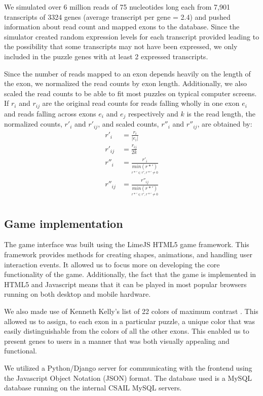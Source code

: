 \documentclass[12pt]{article}
\begin{document}
We simulated over 6 million reads of 75 nucleotides long each from 7,901 transcripts of 3324 genes (average transcript per gene = 2.4) and pushed information about read count and mapped exons to the database. Since the simulator created random expression levels for each transcript provided leading to the possibility that some transcripts may not have been expressed, we only included in the puzzle genes with at least 2 expressed transcripts.

Since the number of reads mapped to an exon depends heavily on the length of the exon, we normalized the read counts by exon length. Additionally, we also scaled the read counts to be able to fit most puzzles on typical computer screens. If $r_i$ and $r_{ij}$ are the original read counts for reads falling wholly in one exon $e_i$ and reads falling across exons $e_i$ and $e_j$ respectively and $k$ is the read length, the normalized counts,  $r'_i$ and $r'_{ij}$, and scaled counts, $r''_i$ and $r''_{ij}$, are obtained by:
\begin{align*}
r'_i &= \frac{r_i}{|e_i|} \\
r'_{ij} &= \frac{r_{ij}}{2k} \\
r''_i &= \frac{r'_i}{\underset{r*' \in r', r*' \not = 0}{min(r*')}} \\
r''_{ij} &= \frac{r''_{ij}}{\underset{r*' \in r', r*' \not = 0}{min(r*')}} \\
\end{align*}

\subsection*{Game implementation}
The game interface was built using the LimeJS HTML5 game framework. This framework provides methods for creating shapes,
animations, and handling user interaction events. It allowed us to focus more on developing the core functionality of the game.
Additionally, the fact that the game is implemented in HTML5 and Javascript means that it can be played in most popular browsers running on both desktop and mobile hardware.

We also made use of Kenneth Kelly's list of 22 colors of maximum contrast \citep{green2010colour}. This allowed us to assign, to each exon in a particular puzzle, a unique color that was easily distinguishable from the colors of all the other exons. This enabled us to present genes to 
users in a manner that was both visually appealing and functional.

We utilized a Python/Django server for communicating with the frontend using the Javascript Object Notation (JSON) format. The database used is a MySQL database running on the internal CSAIL MySQL servers. 
\end{document}
